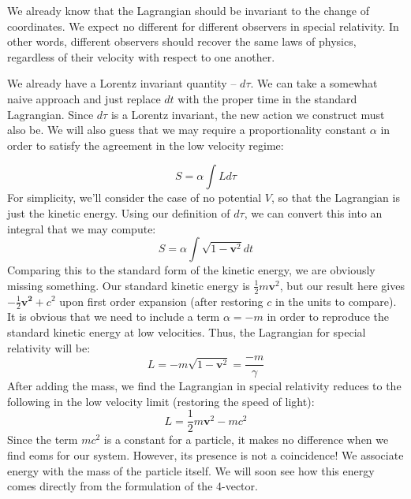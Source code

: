 We already know that the \gls{Lagrangian} should be invariant to the change of coordinates. We expect no different for different observers in special relativity. In other words, different observers should recover the same laws of physics, regardless of their velocity with respect to one another.

We already have a Lorentz invariant quantity -- $d\tau$. We can take a somewhat naive approach and just replace $dt$ with the proper time in the standard \gls{Lagrangian}. Since $d\tau$ is a Lorentz invariant, the new action we construct must also be. We will also guess that we may require a proportionality constant $\alpha$ in order to satisfy the agreement in the low velocity regime:

$$S=\alpha\int Ld\tau$$
For simplicity, we'll consider the case of no potential $V$, so that the \gls{Lagrangian} is just the kinetic energy. Using our definition of $d\tau$, we can convert this into an integral that we may compute:
$$S=\alpha\int\sqrt{1-\bm{v}^2}dt$$
Comparing this to the standard form of the kinetic energy, we are obviously missing something. Our standard kinetic energy is $\frac{1}{2}m\bm{v}^2$, but our result here gives $-\frac{1}{2}\bm{v^2}+c^2$ upon first order expansion (after restoring $c$ in the units to compare). It is obvious that we need to include a term $\alpha=-m$ in order to reproduce the standard kinetic energy at low velocities. Thus, the \gls{Lagrangian} for special relativity will be:
$$L=-m\sqrt{1-\bm{v}^2}=\frac{-m}{\gamma}$$
After adding the mass, we find the \gls{Lagrangian} in special relativity reduces to the following in the low velocity limit (restoring the speed of light):
$$L=\frac{1}{2}m\bm{v}^2-mc^2$$
Since the term $mc^2$ is a constant for a particle, it makes no difference when we find \glspl{eom} for our system. However, its presence is not a coincidence! We associate energy with the mass of the particle itself. We will soon see how this energy comes directly from the formulation of the 4-vector.

